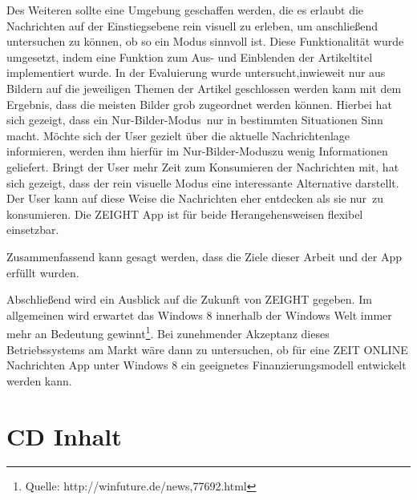 \documentclass[12pt,a4paper,bibtotoc,abstracton]{scrartcl}
\begin{document}
{{{Des Weiteren sollte eine Umgebung geschaffen werden, die es erlaubt die  Nachrichten auf der Einstiegsebene rein visuell zu erleben, um anschließend untersuchen zu können, ob so ein Modus sinnvoll ist. Diese Funktionalität wurde umgesetzt, indem eine Funktion zum Aus- und Einblenden der Artikeltitel implementiert wurde. In der Evaluierung wurde untersucht,inwieweit nur aus Bildern auf die jeweiligen Themen der Artikel geschlossen werden kann mit dem Ergebnis, dass die meisten Bilder grob zugeordnet werden können. Hierbei hat sich gezeigt, dass ein \glqq Nur-Bilder-Modus\grqq\ nur in bestimmten Situationen Sinn macht. Möchte sich der User gezielt über die aktuelle Nachrichtenlage informieren, werden ihm hierfür im \glqq Nur-Bilder-Modus\grqq zu wenig Informationen geliefert. Bringt der User mehr Zeit zum Konsumieren der Nachrichten mit, hat sich gezeigt, dass der rein visuelle Modus eine interessante Alternative darstellt. Der User kann auf diese Weise die Nachrichten eher entdecken als sie \glqq nur\grqq\ zu konsumieren. Die ZEIGHT App ist für beide Herangehensweisen flexibel einsetzbar.

Zusammenfassend kann gesagt werden, dass die Ziele dieser Arbeit und der App erfüllt wurden. 

Abschließend wird ein Ausblick auf die Zukunft von ZEIGHT gegeben. Im allgemeinen wird erwartet das Windows 8 innerhalb der Windows Welt immer mehr an Bedeutung gewinnt\footnote{Quelle: http://winfuture.de/news,77692.html}. Bei zunehmender Akzeptanz dieses Betriebssystems am Markt wäre dann zu untersuchen, ob für eine ZEIT ONLINE Nachrichten App unter Windows 8 ein geeignetes Finanzierungsmodell entwickelt werden kann.

\newpage
\begin{singlespace}
	
	
\end{singlespace}

\newpage
\appendix
{}
\thispagestyle{plain}





\section{CD Inhalt}
\label{app:cd}

}}}
\end{document}
